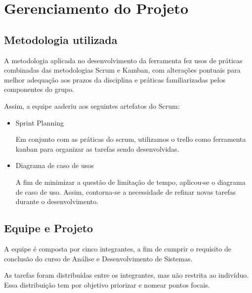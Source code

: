 \chapter{Gerenciamento do Projeto}

	\section{Metodologia utilizada}
		
		A metodologia aplicada no desenvolvimento da ferramenta fez usos de práticas combinadas das metodologias Scrum e Kamban, com alterações pontuais para melhor adequação aos prazos da disciplina e práticas familiarizadas pelos componentes do grupo.

		Assim, a equipe aaderiu aos seguintes artefatos do Scrum:

		\begin{itemize}
			\item 
				Sprint Planning

				Em conjunto com as práticas do scrum, utilizamos o trello como ferramenta kanban para organizar as tarefas sendo desenvolvidas.

			\item 
				Diagrama de caso de usos
				
				A fim de minimizar a questão de limitação de tempo, aplicou-se o diagrama de caso de uso. Assim, contorna-se a necessidade de refinar novas tarefas durante o desenvolvimento.

		\end{itemize}
		
	\section{Equipe e Projeto}

		A equipe é composta por cinco integrantes, a fim de cumprir o requisito de conclusão do curso de Análise e Desenvolvimento de Sistemas.

		As tarefas foram distribuídas entre os integrantes, mas não restrita ao indivíduo. Essa distribuição tem por objetivo priorizar e nomear pontos focais.
		
